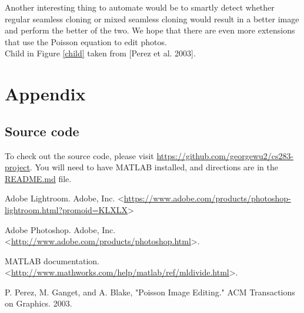 \documentclass[12pt]{article}
\begin{document}
Another interesting thing to automate would be to smartly detect whether regular seamless cloning or mixed seamless cloning would result in a better image and perform the better of the two. We hope that there are even more extensions that use the Poisson equation to edit photos.\\

Child in Figure \ref{child} taken from [Perez et al. 2003].

\section{Appendix}
\subsection{Source code}
To check out the source code, please visit \url{https://github.com/georgewu2/cs283-project}. You will need to have MATLAB installed, and directions are in the \url{README.md} file.
\begin{thebibliography}{99}

Adobe Lightroom. Adobe, Inc. \textless\url{https://www.adobe.com/products/photoshop-lightroom.html?promoid=KLXLX}\textgreater

Adobe Photoshop. Adobe, Inc. \textless\url{http://www.adobe.com/products/photoshop.html}\textgreater.

MATLAB documentation. \textless\url{http://www.mathworks.com/help/matlab/ref/mldivide.html}\textgreater.

P. Perez, M. Ganget, and A. Blake, "Poisson Image Editing." ACM Transactions on Graphics. 2003.
\end{thebibliography}
\end{document}
